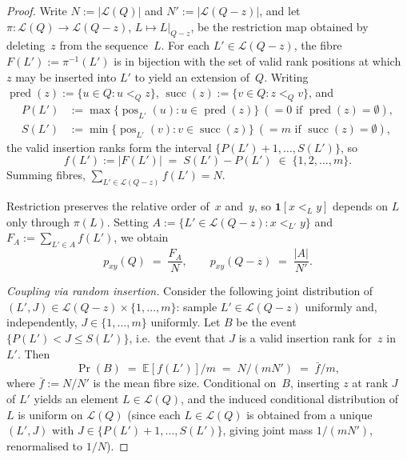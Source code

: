 \begin{proof}
Write $N := |\mathcal L(Q)|$ and $N' := |\mathcal L(Q - z)|$, and let
$\pi\colon \mathcal L(Q) \to \mathcal L(Q - z)$, $L \mapsto L|_{Q-z}$,
be the restriction map obtained by deleting~$z$ from the sequence~$L$.
For each $L' \in \mathcal L(Q-z)$, the fibre
$F(L') := \pi^{-1}(L')$ is in bijection with the set of valid rank
positions at which $z$ may be inserted into $L'$ to yield an extension
of~$Q$. Writing
$\operatorname{pred}(z) := \{u \in Q : u <_Q z\}$,
$\operatorname{succ}(z) := \{v \in Q : z <_Q v\}$, and
\begin{align*}
  P(L') &:= \max\!\big\{\operatorname{pos}_{L'}(u) : u \in \operatorname{pred}(z)\big\}\ (=\!0\text{ if }\operatorname{pred}(z)=\emptyset),\\
  S(L') &:= \min\!\big\{\operatorname{pos}_{L'}(v) : v \in \operatorname{succ}(z)\big\}\ (=\!m\text{ if }\operatorname{succ}(z)=\emptyset),
\end{align*}
the valid insertion ranks form the interval $\{P(L')+1, \ldots, S(L')\}$,
so
\begin{equation}\label{eq:fiber-size}
  f(L') := |F(L')| \;=\; S(L') - P(L') \;\in\; \{1, 2, \ldots, m\}.
\end{equation}
Summing fibres, $\sum_{L' \in \mathcal L(Q-z)} f(L') = N$.

Restriction preserves the relative order of~$x$ and~$y$, so
$\mathbf 1[x <_L y]$ depends on $L$ only through $\pi(L)$. Setting
$A := \{L' \in \mathcal L(Q-z) : x <_{L'} y\}$ and
$F_A := \sum_{L' \in A} f(L')$, we obtain
\begin{equation}\label{eq:pxy-fibers}
  p_{xy}(Q) \;=\; \frac{F_A}{N},
  \qquad
  p_{xy}(Q-z) \;=\; \frac{|A|}{N'}.
\end{equation}

\smallskip\noindent\emph{Coupling via random insertion.} Consider the
following joint distribution of
$(L', J) \in \mathcal L(Q-z) \times \{1, \ldots, m\}$: sample
$L' \in \mathcal L(Q-z)$ uniformly and, independently, $J \in \{1,
\ldots, m\}$ uniformly. Let $B$ be the event
$\{P(L') < J \le S(L')\}$, i.e.\ the event that $J$ is a valid
insertion rank for~$z$ in~$L'$. Then
\[
  \Pr(B) \;=\; \mathbb E[f(L')]/m \;=\; N/(mN') \;=\; \bar f/m,
\]
where $\bar f := N/N'$ is the mean fibre size. Conditional on~$B$,
inserting $z$ at rank $J$ of $L'$ yields an element
$L \in \mathcal L(Q)$, and the induced conditional distribution
of~$L$ is uniform on $\mathcal L(Q)$ (since each $L \in \mathcal L(Q)$
is obtained from a unique $(L', J)$ with $J \in \{P(L')+1, \ldots,
S(L')\}$, giving joint mass $1/(mN')$, renormalised to $1/N$).


\end{proof}
